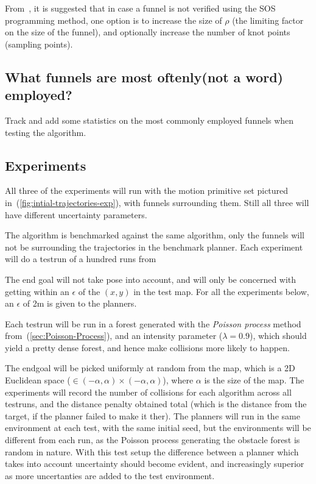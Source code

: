 From~\cite{tobenkinInvariantFunnelsTrajectories2010}, it is suggested that in
case a funnel is not verified using the \ac{SOS} programming method, one option
is to increase the size of \(\rho\) (the limiting factor on the size of the
funnel), and optionally increase the number of knot points (sampling points).

\subsection{What funnels are most oftenly(not a word) employed?}

Track and add some statistics on the most commonly employed funnels when testing
the algorithm.


\subsection{Experiments}

All three of the experiments will run with the motion primitive set pictured
in~(\ref{fig:intial-trajectories-exp}), with funnels surrounding them. Still all
three will have different uncertainty parameters.

The \rrtfunnel{} algorithm is benchmarked against the same algorithm, only the
funnels will not be surrounding the trajectories in the benchmark planner. Each
experiment will do a testrun of a hundred runs from

The end goal will not take pose into account, and will only be concerned with
getting within an \(\epsilon\) of the \((x,y)\) in the test map. For all the
experiments below, an \(\epsilon\) of 2\si{\metre} is given to the planners.

Each testrun will be run in a forest generated with the \textit{Poisson process}
method from~(\ref{sec:Poisson-Process}), and an intensity parameter (\(\lambda =
0.9\)), which should yield a pretty dense forest, and hence make collisions more
likely to happen.

The endgoal will be picked uniformly at random from the map, which is a 2D
Euclidean space (\ie \(\in (-\alpha,\alpha)\times(-\alpha,\alpha)\)), where
\(\alpha\) is the size of the map. The experiments will record the number of
collisions for each algorithm across all testruns, and the distance penalty
obtained total (which is the distance from the target, if the planner failed to
make it ther). The planners will run in the same environment at each test, with
the same initial seed, but the environments will be different from each run, as
the Poisson process generating the obstacle forest is random in nature. With
this test setup the difference between a planner which takes into account
uncertainty should become evident, and increasingly superior as more
uncertanties are added to the test environment.

